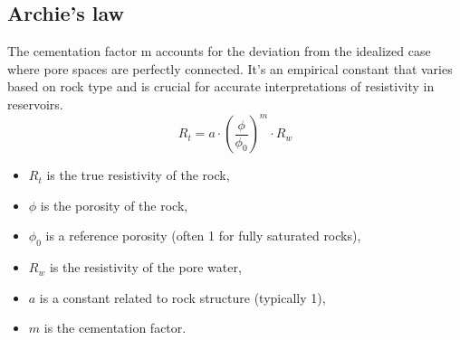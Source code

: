 \documentclass{article}
\begin{document}
\subsection{Archie's law}
The cementation factor m accounts for the deviation from the idealized case where pore spaces are perfectly connected. It's an empirical constant that varies based on rock type and is crucial for accurate interpretations of resistivity in reservoirs.
\[
R_t = a \cdot \left( \frac{\phi}{\phi_0} \right)^m \cdot R_w
\]
\begin{itemize}
  \item \( R_t \) is the true resistivity of the rock,
  \item \( \phi \) is the porosity of the rock,
  \item \( \phi_0 \) is a reference porosity (often 1 for fully saturated rocks),
  \item \( R_w \) is the resistivity of the pore water,
  \item \( a \) is a constant related to rock structure (typically 1),
  \item \( m \) is the cementation factor.
\end{itemize}

\FloatBarrier  %
\end{document}
